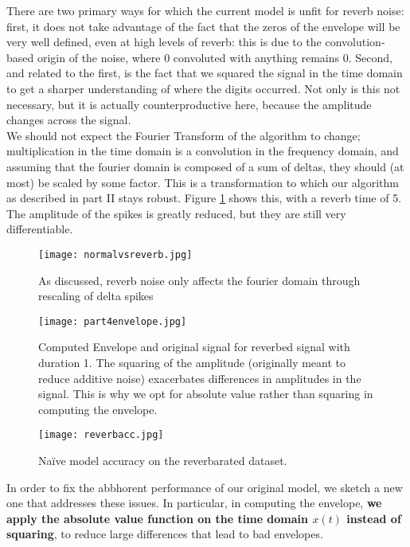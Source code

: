 \documentclass{article}
\begin{document}
There are two primary ways for which the current model is unfit for reverb noise: first, it does not take advantage of the fact that the zeros of the envelope will be very well defined, even at high levels of reverb: this is due to the convolution-based origin of the noise, where 0 convoluted with anything remains 0.
Second, and related to the first, is the fact that we squared the signal in the time domain to get a sharper understanding of where the digits occurred. Not only is this not necessary, but it is actually counterproductive here, because the amplitude changes across the signal.\\

We should not expect the Fourier Transform of the algorithm to change; multiplication in the time domain is a convolution in the frequency domain, and assuming that the fourier domain is composed of a sum of deltas, they should (at most) be scaled by some factor. This is a transformation to which our algorithm as described in part II stays robust. Figure \ref{normalvsreverb} shows this, with a reverb time of 5. The amplitude of the spikes is greatly reduced, but they are still very differentiable. \\

\begin{figure}[h]
	\texttt{[image: normalvsreverb.jpg]}
	\caption{As discussed, reverb noise only affects the fourier domain through rescaling of delta spikes}
	\label{normalvsreverb}
\end{figure}

\begin{figure}[h]
	\texttt{[image: part4envelope.jpg]}
	\caption{Computed Envelope and original signal for reverbed signal with duration 1. The squaring of the amplitude (originally meant to reduce additive noise) exacerbates differences in amplitudes in the signal. This is why we opt for absolute value rather than squaring in computing the envelope.}
	\label{part4envelope}
\end{figure}

\begin{figure}[h]
	\texttt{[image: reverbacc.jpg]}
	\caption{Naïve model accuracy on the reverbarated dataset.}	
	\label{reverbacc}
\end{figure}

In order to fix the abbhorent performance of our original model, we sketch a new one that addresses these issues. In particular, in computing the envelope, \textbf{we apply the absolute value function on the time domain $x(t)$ instead of squaring}, to reduce large differences that lead to bad envelopes.
\end{document}
